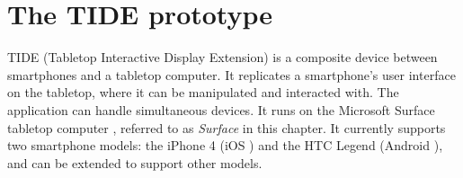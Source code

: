 

\chapter{The TIDE prototype}
\label{system}

TIDE (Tabletop Interactive Display Extension) is a composite device between smartphones and a tabletop computer.
It replicates a smartphone's user interface on the tabletop, where it can be manipulated and interacted with.
The application can handle simultaneous devices.
It runs on the Microsoft Surface tabletop computer \citep{ms}, referred to as \emph{Surface} in this chapter.
It currently supports two smartphone models: the iPhone 4 (iOS  \citep{ios}) and the HTC Legend (Android  \citep{android}), and can be extended to support other models.


